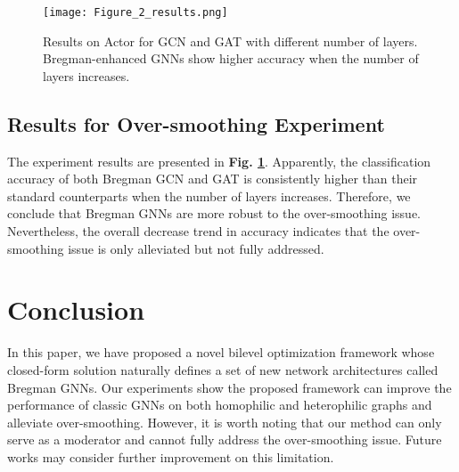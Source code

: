 \documentclass{article}
\begin{document}
\begin{figure}[t]
\begin{minipage}[b]{1.0\linewidth}
  \centering
\centerline{\texttt{[image: Figure\_2\_results.png]}}
\end{minipage}
\caption{Results on Actor for GCN and GAT with different number of layers. Bregman-enhanced GNNs show higher accuracy when the number of layers increases.}
\label{fig:oversmotthing}
\end{figure}

\subsection{Results for Over-smoothing Experiment}
The experiment results are presented in \textbf{Fig. \ref{fig:oversmotthing}}. Apparently, the classification accuracy of both Bregman GCN and GAT is consistently higher than their standard counterparts when the number of layers increases. Therefore, we conclude that Bregman GNNs are more robust to the over-smoothing issue. Nevertheless, the overall decrease trend in accuracy indicates that the over-smoothing issue is only alleviated but not fully addressed.

\section{Conclusion}
\label{sec:conclusion}
In this paper, we have proposed a novel bilevel optimization framework whose closed-form solution naturally defines a set of new network architectures called Bregman GNNs. Our experiments show the proposed framework can improve the performance of classic GNNs on both homophilic and heterophilic graphs and alleviate over-smoothing. However, it is worth noting that our method can only serve as a moderator and cannot fully address the over-smoothing issue. Future works may consider further improvement on this limitation.







\end{document}
